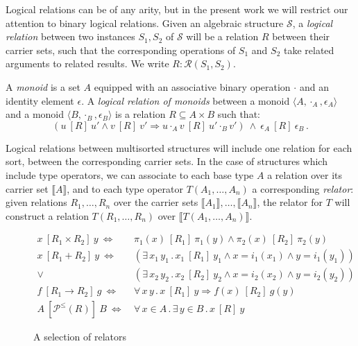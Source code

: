 \documentclass[acmsmall,timestamp,review,anonymous]{acmart}
\newcommand{\ifr}[1]{\ [{#1}]\ }
\begin{document}
Logical relations can be of any arity,
but in the present work
we will restrict our attention to
binary logical relations.
Given an algebraic structure $\mathcal{S}$,
a \emph{logical relation}
between two instances $S_1, S_2$ of $\mathcal{S}$
will be a relation $R$
between their carrier sets,
such that the corresponding operations of $S_1$ and $S_2$
take related arguments to related results.
We write $R : \mathcal{R}(S_1, S_2)$.

\begin{example}
\label{ex:monoid}
A \emph{monoid} is a set $A$ equipped with
an associative binary operation $\cdot$ and
an identity element $\epsilon$.
A \emph{logical relation of monoids} between
a monoid $\langle A, \cdot_A, \epsilon_A \rangle$ and
a monoid $\langle B, \cdot_B, \epsilon_B \rangle$
is a relation $R \subseteq A \times B$
such that:
\[
(u \ifr{R} u' \wedge v \ifr{R} v' \Rightarrow u \cdot_A v \ifr{R} u' \cdot_B
v')
\: \wedge \:
\epsilon_A \ifr{R} \epsilon_B \,.
\]
\end{example}

Logical relations between multisorted structures
will include one relation for each sort,
between the corresponding carrier sets.
In the case of structures which include type operators,
we can associate to each base type $A$
a relation over its carrier set $\llbracket A \rrbracket$,
and to each type operator $T(A_1, \ldots, A_n)$
a corresponding \emph{relator}:
given relations $R_1, \ldots, R_n$ over
the carrier sets $\llbracket A_1 \rrbracket, \ldots, \llbracket A_n \rrbracket$,
the relator for $T$
will construct a relation $T(R_1, \ldots, R_n)$
over $\llbracket T(A_1, \ldots, A_n) \rrbracket$.

\begin{figure} %
  {\small
  \begin{align*}
    x \ifr{R_1 \times R_2} y \ \Leftrightarrow\  &
      \pi_1(x) \ifr{R_1} \pi_1(y) \wedge
      \pi_2(x) \ifr{R_2} \pi_2(y) \\
    x \ifr{R_1 + R_2} y \ \Leftrightarrow\  &
      (\exists \, x_1 \, y_1 \,.\,
        x_1 \ifr{R_1} y_1 \wedge
        x = i_1(x_1) \wedge
        y = i_1(y_1)) \\ \vee\ &
      (\exists \, x_2 \, y_2 \,.\,
        x_2 \ifr{R_2} y_2 \wedge
        x = i_2(x_2) \wedge
        y = i_2(y_2)) \\
    f \ifr{R_1 \rightarrow R_2} g \ \Leftrightarrow\  &
      \forall \, x \, y \,.\,
        x \ifr{R_1} y \Rightarrow
        f(x) \ifr{R_2} g(y) \\
    A \ifr{\mathcal{P}^\le(R)} B \ \Leftrightarrow\  &
      \forall \, x \in A \,.\,
      \exists \, y \in B \,.\,
      x \ifr{R} y
  \end{align*}
  }%
  \caption{A selection of relators}
  \label{fig:relators}
\end{figure}
\end{document}
